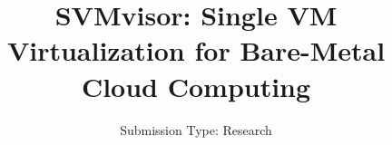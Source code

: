 \documentclass[10pt,twocolumn]{article}
\begin{document}
\title{SVMvisor: Single VM Virtualization for Bare-Metal Cloud Computing}
\author{
\small Submission Type: Research
}
\date{}
\maketitle











\end{document}
